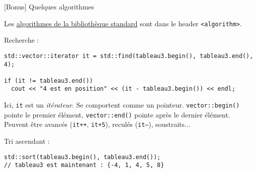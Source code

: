 \documentclass[c]{beamer}
\newcommand{\inline}[1]{\texttt{#1}}
\begin{document}
\begin{frame}[fragile]{[Bonus] Quelques algorithmes}

Les \href{https://en.cppreference.com/w/cpp/algorithm}{algorithmes de la bibliothèque standard} sont dans le header \texttt{<algorithm>}.

\vspace{1em}
Recherche :

\begin{verbatim}
std::vector::iterator it = std::find(tableau3.begin(), tableau3.end(), 4);

if (it != tableau3.end())
  cout << "4 est en position" << (it - tableau3.begin()) << endl;
\end{verbatim}

Ici, \texttt{it} est un \emph{itérateur}. Se comportent comme un pointeur. \inline{vector::begin()} pointe le premier élément, \inline{vector::end()} pointe après le dernier élément. Peuvent être avancés (\inline{it++}, \inline{it+5}), reculés (\inline{it--}), soustraits...

\vspace{1em}
Tri ascendant :

\begin{verbatim}
std::sort(tableau3.begin(), tableau3.end());
// tableau3 est maintenant : {-4, 1, 4, 5, 8}
\end{verbatim}

\end{frame}





\end{document}
